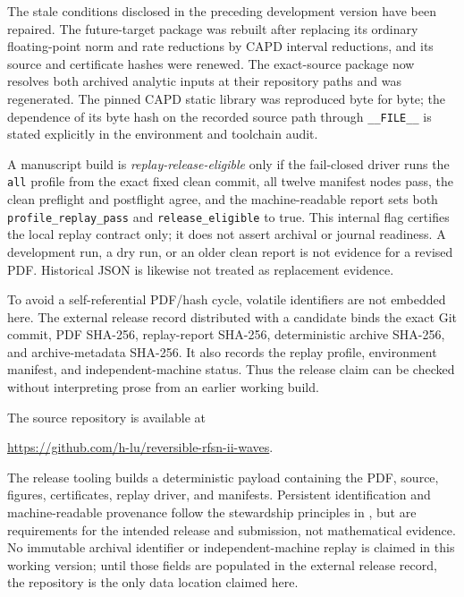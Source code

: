 \documentclass[11pt]{amsart}
\numberwithin{equation}{section}
\theoremstyle{definition}
\theoremstyle{remark}
\begin{document}
The stale conditions disclosed in the preceding development version have
been repaired.  The future-target package was rebuilt after replacing its
ordinary floating-point norm and rate reductions by CAPD interval
reductions, and its source and certificate hashes were renewed.  The
exact-source package now resolves both archived analytic inputs at their
repository paths and was regenerated.  The pinned CAPD static library was
reproduced byte for byte; the dependence of its byte hash on the recorded
source path through \texttt{\_\_FILE\_\_} is stated explicitly in the
environment and toolchain audit.

A manuscript build is \emph{replay-release-eligible} only if the fail-closed driver runs
the \texttt{all} profile from the exact fixed clean commit, all twelve
manifest nodes pass, the clean preflight and postflight agree, and the
machine-readable report sets both \texttt{profile\_replay\_pass} and
\texttt{release\_eligible} to true.  This internal flag certifies the local
replay contract only; it does not assert archival or journal readiness.
A development run, a dry run, or an
older clean report is not evidence for a revised PDF.  Historical JSON is
likewise not treated as replacement evidence.

To avoid a self-referential PDF/hash cycle, volatile identifiers are not
embedded here.  The external release record distributed with a candidate
binds the exact Git commit, PDF SHA-256, replay-report SHA-256, deterministic
archive SHA-256, and archive-metadata SHA-256.  It also records the replay
profile, environment manifest, and independent-machine status.  Thus the
release claim can be checked without interpreting prose from an earlier
working build.

The source repository is available at
\begin{center}
\url{https://github.com/h-lu/reversible-rfsn-ii-waves}.
\end{center}
The release tooling builds a deterministic payload containing the PDF,
source, figures, certificates, replay driver, and manifests.  Persistent
identification and machine-readable provenance follow the stewardship
principles in \cite{WilkinsonEtAl2016FAIR}, but are requirements for the
intended release and submission,
not mathematical evidence.  No immutable archival identifier or
independent-machine replay is claimed in this working version; until those
fields are populated in the external release record, the repository is the
only data location claimed here.
\end{document}
